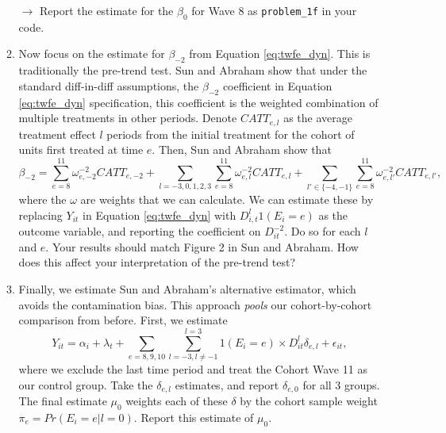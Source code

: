 \documentclass[11pt, a4paper]{article}
\begin{document}
\begin{enumerate}
\begin{enumerate}
        \hspace{10pt} $\rightarrow$ Report the estimate for the $\beta_{0}$  for Wave 8 as   \texttt{problem\_1f} in your code. 
      \item Now focus on the estimate for $\beta_{-2}$ from Equation
        \ref{eq:twfe_dyn}. This is traditionally the pre-trend test. Sun
        and Abraham show that under the standard diff-in-diff assumptions,
        the $\beta_{-2}$ coefficient in Equation \ref{eq:twfe_dyn}
        specification, this coefficient is the weighted combination of
        multiple treatments in other periods. Denote $CATT_{e,l}$ as the
        average treatment effect $l$ periods from the initial treatment
        for the cohort of units first treated at time $e$. Then, Sun and Abraham show that
        \begin{equation}
          \beta_{-2} = \sum_{e=8}^{11}\omega_{e,-2}^{-2}CATT_{e,-2} + \sum_{l=-3,0,1,2,3}\sum_{e=8}^{11}\omega_{e,l}^{-2}CATT_{e,l} + \sum_{l'\in\{-4,-1\}}\sum_{e=8}^{11}\omega_{e,l'}^{-2}CATT_{e,l'}, 
        \end{equation}
        where the $\omega$ are weights that we can calculate. We can
        estimate these by replacing $Y_{it}$ in Equation \ref{eq:twfe_dyn}
        with $D_{i,t}^{l}1(E_{i}=e)$ as the outcome variable, and
        reporting the coefficient on $D^{-2}_{it}$. Do so for each $l$ and
        $e$. Your results should match Figure 2 in Sun and Abraham. How
        does this affect your interpretation of the pre-trend test?
      \item Finally, we estimate Sun and Abraham's alternative estimator,
        which avoids the contamination bias. This approach \emph{pools}
        our cohort-by-cohort comparison from before. First, we estimate
        \begin{equation}
          Y_{it} = \alpha_{i} + \lambda_{t} + \sum_{e = 8,9,10} \sum_{l =-3, l \not=-1}^{l=3} 1(E_{i} = e) \times D^{l}_{it}\delta_{e,l} + \epsilon_{it},
        \end{equation}
        where we exclude the last time period and treat the Cohort Wave 11
        as our control group. Take the $\delta_{e,l}$ estimates, and
        report $\delta_{e,0}$ for all 3 groups. The final estimate
        $\mu_{0}$ weights each of these $\delta$ by the cohort sample
        weight $\pi_{e} = Pr(E_{i} = e | l = 0)$. Report this estimate of
        $\mu_{0}$.


\end{enumerate}
\end{enumerate}
\end{document}
